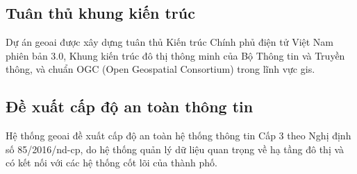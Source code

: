 \subsection{Tuân thủ khung kiến trúc}
Dự án \gls{geoai} được xây dựng tuân thủ Kiến trúc Chính phủ điện tử Việt Nam phiên bản 3.0, Khung kiến trúc đô thị thông minh của Bộ Thông tin và Truyền thông, và chuẩn OGC (Open Geospatial Consortium) trong lĩnh vực \gls{gis}.

\subsection{Đề xuất cấp độ an toàn thông tin}
Hệ thống \gls{geoai} đề xuất cấp độ an toàn hệ thống thông tin Cấp 3 theo Nghị định số 85/2016/\gls{nd-cp}, do hệ thống quản lý dữ liệu quan trọng về hạ tầng đô thị và có kết nối với các hệ thống cốt lõi của thành phố.

\cleardoublepage
